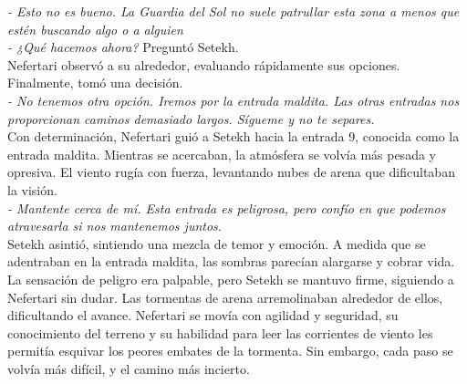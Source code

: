 \textit{- Esto no es bueno. La Guardia del Sol no suele patrullar esta zona a menos que estén buscando algo o a alguien}\\
\textit{- ¿Qué hacemos ahora?} Preguntó Setekh.\\
Nefertari observó a su alrededor, evaluando rápidamente sus opciones. Finalmente, tomó una decisión.\\
\textit{- No tenemos otra opción. Iremos por la entrada maldita. Las otras entradas nos proporcionan caminos demasiado largos. Sígueme y no te separes.} \\
Con determinación, Nefertari guió a Setekh hacia la entrada 9, conocida como la entrada maldita. Mientras se acercaban, la atmósfera se volvía más pesada y opresiva. El viento rugía con fuerza, levantando nubes de arena que dificultaban la visión.\\
\textit{- Mantente cerca de mí. Esta entrada es peligrosa, pero confío en que podemos atravesarla si nos mantenemos juntos.}\\
Setekh asintió, sintiendo una mezcla de temor y emoción. A medida que se adentraban en la entrada maldita, las sombras parecían alargarse y cobrar vida. La sensación de peligro era palpable, pero Setekh se mantuvo firme, siguiendo a Nefertari sin dudar. Las tormentas de arena arremolinaban alrededor de ellos, dificultando el avance. Nefertari se movía con agilidad y seguridad, su conocimiento del terreno y su habilidad para leer las corrientes de viento les permitía esquivar los peores embates de la tormenta. Sin embargo, cada paso se volvía más difícil, y el camino más incierto.

